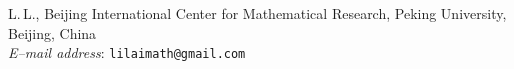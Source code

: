 \documentclass[12pt]{article}
\numberwithin{equation}{section}
\begin{document}
\vspace*{3mm}
\begin{flushright}
\begin{minipage}{148mm}\sc\footnotesize
L.\,L., Beijing International Center for Mathematical Research, Peking University, Beijing, China\\
{\it E--mail address}: {\tt lilaimath@gmail.com} \vspace*{3mm}
\end{minipage}
\end{flushright}
\end{document}
